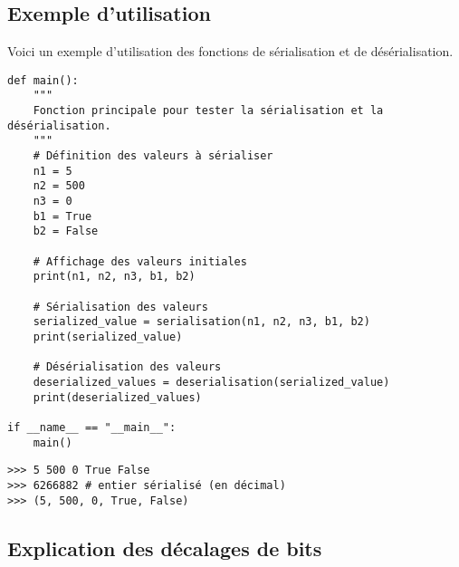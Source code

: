 \documentclass{article}
\begin{document}
\break\subsection*{Exemple d'utilisation}

Voici un exemple d'utilisation des fonctions de sérialisation et de désérialisation.

\begin{lstlisting}[caption=Exemple d'Utilisation]
def main():
    """
    Fonction principale pour tester la sérialisation et la désérialisation.
    """
    # Définition des valeurs à sérialiser
    n1 = 5
    n2 = 500
    n3 = 0
    b1 = True
    b2 = False
    
    # Affichage des valeurs initiales
    print(n1, n2, n3, b1, b2)
    
    # Sérialisation des valeurs
    serialized_value = serialisation(n1, n2, n3, b1, b2)
    print(serialized_value)
    
    # Désérialisation des valeurs
    deserialized_values = deserialisation(serialized_value)
    print(deserialized_values)

if __name__ == "__main__":
    main()
\end{lstlisting}

\begin{lstlisting}[caption=Résultat de l'exemple d'utilisation]
>>> 5 500 0 True False
>>> 6266882 # entier sérialisé (en décimal)
>>> (5, 500, 0, True, False)
\end{lstlisting}

\subsection*{Explication des décalages de bits}
\end{document}
